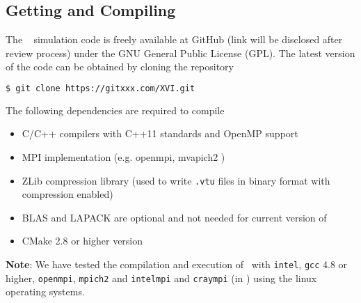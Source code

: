 \subsection{Getting and Compiling \dendrokt~}

The \dendrokt~ simulation code is freely available at GitHub (link will be disclosed after review process) under the GNU General Public License (GPL). 
The latest version of the code can be obtained by cloning the repository
\begin{lstlisting}[language=bash]
$ git clone https://gitxxx.com/XVI.git
\end{lstlisting}

The following dependencies are required to compile \dendrokt~
\begin{itemize}
	\item C/C++ compilers with C++11 standards and OpenMP support
	\item MPI implementation (e.g. openmpi, mvapich2 )
	\item ZLib compression library (used to write \texttt{.vtu} files in binary format with compression enabled)
	\item BLAS and LAPACK are optional and not needed for current version of \dendrokt~
	\item CMake 2.8 or higher version
\end{itemize}

\textbf{Note}: We have tested the compilation and execution of \dendrokt \ with \texttt{intel}, \texttt{gcc} 4.8 or higher, \texttt{openmpi}, \texttt{mpich2} and \texttt{intelmpi} and \texttt{craympi} (in \Titan) using the linux operating systems. 

